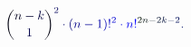 \documentclass[12pt]{article}
\begin{document}
\makeatletter
\renewcommand*{\@textcolor}[3]{%
  \protect\leavevmode
  \begingroup
    \color#1{#2}#3%
  \endgroup
}
\makeatother
\begin{displaymath}
\mathcolor[RGB]{0,0,15}{\binom { \mathcolor[RGB]{0,0,30}{n} \mathcolor[RGB]{0,0,45}{-} \mathcolor[RGB]{0,0,60}{k} } { \mathcolor[RGB]{0,0,75}{1} } } ^ { \mathcolor[RGB]{0,0,90}{2} } \mathcolor[RGB]{0,0,105}{\cdot} \mathcolor[RGB]{0,0,120}{(} \mathcolor[RGB]{0,0,135}{n} \mathcolor[RGB]{0,0,150}{-} \mathcolor[RGB]{0,0,165}{1} \mathcolor[RGB]{0,0,180}{)} \mathcolor[RGB]{0,0,195}{!} ^ { \mathcolor[RGB]{0,0,210}{2} } \mathcolor[RGB]{0,0,225}{\cdot} \mathcolor[RGB]{0,0,240}{n} \mathcolor[RGB]{0,0,255}{!} ^ { \mathcolor[RGB]{0,15,0}{2} \mathcolor[RGB]{0,15,15}{n} \mathcolor[RGB]{0,15,30}{-} \mathcolor[RGB]{0,15,45}{2} \mathcolor[RGB]{0,15,60}{k} \mathcolor[RGB]{0,15,75}{-} \mathcolor[RGB]{0,15,90}{2} } \mathcolor[RGB]{0,15,105}{.}
\end{displaymath}
\end{document}
